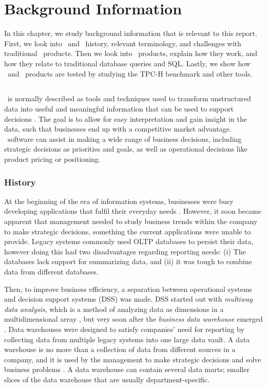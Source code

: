 \chapter{Background Information}
\label{chap:background}
In this chapter, we study background information that is relevant to this report. First, we look into \bi~and \bi~history, relevant terminology, and challenges with traditional \bi~products. Then we look into \bd~products, explain how they work, and how they relate to traditional database queries and SQL. Lastly, we show how \bi~and \bd~products are tested by studying the TPC-H benchmark and other tools.

\clearpage

\section{\bi}
\label{sec:Business Intelligence}
\bi~is normally described as tools and techniques used to transform unstructured data into useful and meaningful information that can be used to support decisions \cite{Wikipedia_contributors2015-ag}. The goal is to allow for easy interpretation and gain insight in the data, such that businesses end up with a competitive market advantage. \bi~software can assist in making a wide range of business decisions, including strategic decisions as priorities and goals, as well as operational decisions like product pricing or positioning.

\subsection{History}
\label{sub:History}
At the beginning of the era of information systems, businesses were busy developing applications that fulfil their everyday needs \cite{Pavlic2002-nm}. However, it soon became apparent that management needed to study business trends within the company to make strategic decisions, something the current applications were unable to provide. Legacy systems commonly used OLTP databases to persist their data, however doing this had two disadvantages regarding reporting needs: (i) The databases lack support for summarizing data, and (ii) it was tough to combine data from different databases.

Then, to improve business efficiency, a separation between operational systems and decision support systems (DSS) was made. DSS started out with \textit{multiway data analysis}, which is a method of analyzing data as dimensions in a multidimensional array \cite{Wikipedia_contributors2015-zu}, but very soon after the \textit{business data warehouse} emerged \cite{Devlin1988-yu}. Data warehouses were designed to satisfy companies' need for reporting by collecting data from multiple legacy systems into one large data vault. A data warehouse is no more than a collection of data from different sources in a company, and it is used by the management to make strategic decisions and solve business problems \cite{Pavlic2002-nm}. A data warehouse can contain several data marts; smaller slices of the data warehouse that are usually department-specific.

